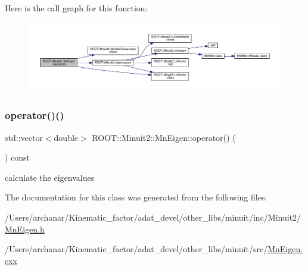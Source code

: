 Here is the call graph for this function\+:\nopagebreak
\begin{figure}[H]
\begin{center}
\leavevmode
\includegraphics[width=350pt]{d8/dce/classROOT_1_1Minuit2_1_1MnEigen_aba6999f348c2cbc8055528faf207b7d6_cgraph}
\end{center}
\end{figure}
\mbox{\label{classROOT_1_1Minuit2_1_1MnEigen_aba021c8f81549aae00ad600c3d3c2f93}} 
\subsubsection{\texorpdfstring{operator()()}{operator()()}\hspace{0.1cm}{\footnotesize\ttfamily [2/2]}}
{\footnotesize\ttfamily std\+::vector$<$double$>$ R\+O\+O\+T\+::\+Minuit2\+::\+Mn\+Eigen\+::operator() (\begin{DoxyParamCaption}\item[{const \mbox{\hyperlink{classROOT_1_1Minuit2_1_1MnUserCovariance}{Mn\+User\+Covariance}} \&}]{ }\end{DoxyParamCaption}) const}



calculate the eigenvalues 



The documentation for this class was generated from the following files\+:\begin{DoxyCompactItemize}
\item 
/\+Users/archanar/\+Kinematic\+\_\+factor/adat\+\_\+devel/other\+\_\+libs/minuit/inc/\+Minuit2/\mbox{\hyperlink{other__libs_2minuit_2inc_2Minuit2_2MnEigen_8h}{Mn\+Eigen.\+h}}\item 
/\+Users/archanar/\+Kinematic\+\_\+factor/adat\+\_\+devel/other\+\_\+libs/minuit/src/\mbox{\hyperlink{MnEigen_8cxx}{Mn\+Eigen.\+cxx}}\end{DoxyCompactItemize}
